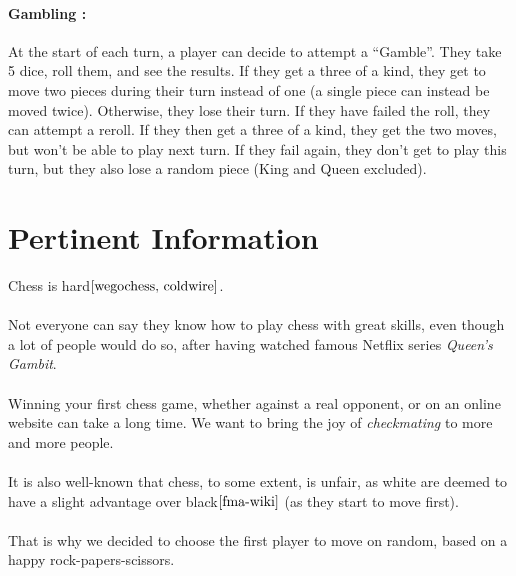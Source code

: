 \documentclass[12pt]{article}
\begin{document}
            
            \paragraph{Gambling :\\}
            At the start of each turn, a player can decide to attempt a “Gamble”. They take 5 dice, roll them, and see the results. If they get a three of a kind, they get to move two pieces during their turn instead of one (a single piece can instead be moved twice). Otherwise, they lose their turn.
            If they have failed the roll, they can attempt a reroll. If they then get a three of a kind, they get the two moves, but won't be able to play next turn. If they fail again, they don’t get to play this turn, but they also lose a random piece (King and Queen excluded).

    \section{Pertinent Information}
        Chess is hard$\cite{wegochess, coldwire}$.
        \\\\Not everyone can say they know how to play chess with great skills, even though a lot of people would do so, after having watched famous Netflix series \textit{Queen's Gambit}.
        \\\\Winning your first chess game, whether against a real opponent, or on an online website can take a long time. We want to bring the joy of \textit{checkmating} to more and more people.
        \\\\It is also well-known that chess, to some extent, is unfair, as white are deemed to have a slight advantage over black$\cite{fma-wiki}$  (as they start to move first).
        \\\\That is why we decided to choose the first player to move on random, based on a happy rock-papers-scissors.
    
\end{document}
